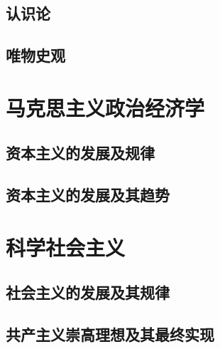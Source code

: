 \documentclass[10pt, UTF8]{book} %
\renewcommand{\chaptermark}[1]{\markboth{第 \thechapter 章 \hspace{1em} #1}{}}
\begin{document}
\newpage
\thispagestyle{empty}

\chapter{认识论}
\chapter{唯物史观}

\part{马克思主义政治经济学}

\chapter{资本主义的发展及规律}
\chapter{资本主义的发展及其趋势}

\part{科学社会主义}

\chapter{社会主义的发展及其规律}
\chapter{共产主义崇高理想及其最终实现}

\appendix
\renewcommand{\chaptermark}[1]{\markboth{附录 \thechapter\, #1}{}}

\end{document}

